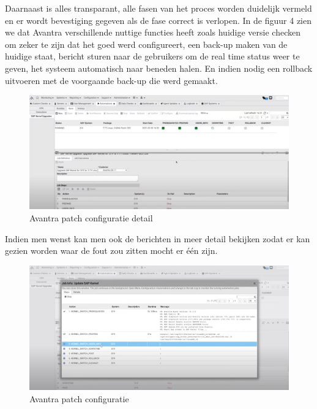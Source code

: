 Daarnaast is alles transparant, alle fasen van het proces worden duidelijk vermeld en er wordt bevestiging gegeven als de fase correct is verlopen. In de figuur 4 zien we dat Avantra verschillende
nuttige functies heeft zoals huidige versie checken om zeker te zijn dat het goed werd configureert, een back-up maken van de huidige staat, bericht sturen naar de gebruikers om de real time status weer
   te geven, het systeem automatisch naar beneden halen. En indien nodig een rollback uitvoeren met de voorgaande back-up die werd gemaakt.

\begin{figure}[htbp]
    \centering
    \includegraphics[width=\textwidth]{avantra2.png}
    \caption{Avantra patch configuratie detail}
     \label{fig:avantra2}
\end{figure}

Indien men wenst kan men ook de berichten in meer detail bekijken zodat er kan gezien worden waar de fout zou zitten mocht er één zijn.

\begin{figure}[htbp]
    \centering
    \includegraphics[width=\textwidth]{avantra3.png}
    \caption{Avantra patch configuratie}
     \label{fig:avantra3}
\end{figure}



